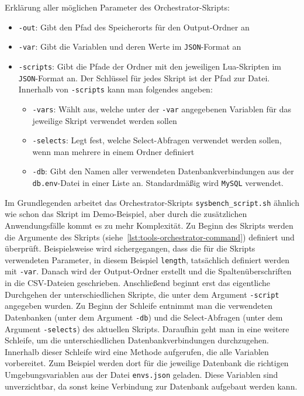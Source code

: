 Erklärung aller möglichen Parameter des Orchestrator-Skripts:
\begin{itemize}
    \setlength{\itemsep}{-5pt}
    \item \texttt{-out}: Gibt den Pfad des Speicherorts für den Output-Ordner an
    \item \texttt{-var}: Gibt die Variablen und deren Werte im \texttt{JSON}-Format an
    \item \texttt{-scripts}: Gibt die Pfade der Ordner mit den jeweiligen Lua-Skripten im \texttt{JSON}-Format an.
    Der Schlüssel für jedes Skript ist der Pfad zur Datei.
    \vspace{2pt}
    \newline Innerhalb von \texttt{-scripts} kann man folgendes angeben:
    \begin{itemize}
        \setlength{\itemsep}{-5pt}
        \item \texttt{-vars}: Wählt aus, welche unter der \texttt{-var} angegebenen Variablen für das jeweilige Skript verwendet werden sollen
        \item \texttt{-selects}: Legt fest, welche Select-Abfragen verwendet werden sollen, wenn man mehrere in einem Ordner definiert
        \item \texttt{-db}: Gibt den Namen aller verwendeten Datenbankverbindungen aus der \texttt{db.env}-Datei in einer Liste an.
        Standardmäßig wird \texttt{MySQL} verwendet.
    \end{itemize}
\end{itemize}

Im Grundlegenden arbeitet das Orchestrator-Skripts \texttt{sysbench\_script.sh} ähnlich wie schon das Skript im Demo-Beispiel, aber durch die zusätzlichen Anwendungsfälle kommt es zu mehr Komplexität.
Zu Beginn des Skripts werden die Argumente des Skripts (siehe~\ref{lst:tools-orchestrator-command}) definiert und überprüft.
Beispielsweise wird sichergegangen, dass die für die Skripts verwendeten Parameter, in diesem Beispiel \texttt{length}, tatsächlich definiert werden mit \texttt{-var}.
Danach wird der Output-Ordner erstellt und die Spaltenüberschriften in die CSV-Dateien geschrieben.
Anschließend beginnt erst das eigentliche Durchgehen der unterschiedlichen Skripte, die unter dem Argument \texttt{-script} angegeben wurden.
Zu Beginn der Schleife entnimmt man die verwendeten Datenbanken (unter dem Argument \texttt{-db}) und die Select-Abfragen (unter dem Argument \texttt{-selects}) des aktuellen Skripts.
Daraufhin geht man in eine weitere Schleife, um die unterschiedlichen Datenbankverbindungen durchzugehen.
Innerhalb dieser Schleife wird eine Methode aufgerufen, die alle Variablen vorbereitet.
Zum Beispiel werden dort für die jeweilige Datenbank die richtigen Umgebungsvariablen aus der Datei \texttt{envs.json} geladen.
Diese Variablen sind unverzichtbar, da sonst keine Verbindung zur Datenbank aufgebaut werden kann.


